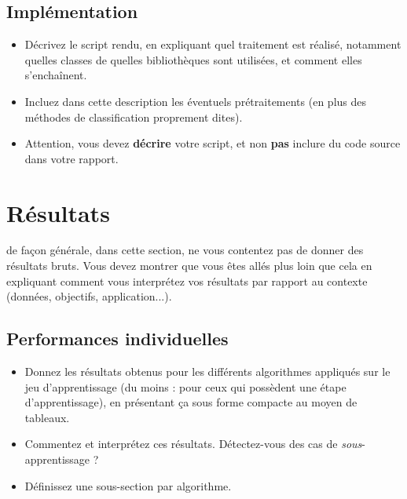 \documentclass{ceri/sty/rapport}
\begin{document}
\subsection{Implémentation}
\begin{itemize}
	\item Décrivez le script rendu, en expliquant quel traitement est réalisé, notamment quelles classes de quelles bibliothèques sont utilisées, et comment elles s'enchaînent.
    \item Incluez dans cette description les éventuels prétraitements (en plus des méthodes de classification proprement dites).
	\item Attention, vous devez \textbf{décrire} votre script, et non \textbf{pas} inclure du code source dans votre rapport.
\end{itemize}



















\section{Résultats}
\label{sec:Resultats}
\begin{beware}[Attention]
de façon générale, dans cette section, ne vous contentez pas de donner des résultats bruts. Vous devez montrer que vous êtes allés plus loin que cela en expliquant comment vous interprétez vos résultats par rapport au contexte (données, objectifs, application...).
\end{beware}




\subsection{Performances individuelles}
\begin{itemize}
	\item Donnez les résultats obtenus pour les différents algorithmes appliqués sur le jeu d'apprentissage (du moins : pour ceux qui possèdent une étape d'apprentissage), en présentant ça sous forme compacte au moyen de tableaux.
	\item Commentez et interprétez ces résultats. Détectez-vous des cas de \textit{sous}-apprentissage ?
	\item Définissez une sous-section par algorithme.
\end{itemize}
\end{document}
